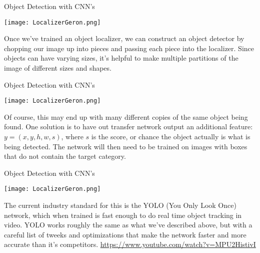 \documentclass[10pt, table, dvipsnames,xcdraw, handout]{beamer}
\begin{document}
\begin{frame}[fragile]{Object Detection with CNN's}
  \begin{minipage}[t][0.4\textheight][t]{\textwidth}\centering
	\centering \texttt{[image: LocalizerGeron.png]}
  \end{minipage}
  \vfill
\begin{minipage}[t][0.6\textheight][t]{\textwidth}
Once we've trained an object localizer, we can construct an object detector by chopping our image up into pieces and passing each piece into the localizer. Since objects can have varying sizes, it's helpful to make multiple partitions of the image of different sizes and shapes. 
\end{minipage}
\end{frame}



\begin{frame}[fragile]{Object Detection with CNN's}
  \begin{minipage}[t][0.4\textheight][t]{\textwidth}\centering
	\centering \texttt{[image: LocalizerGeron.png]}
  \end{minipage}
  \vfill
\begin{minipage}[t][0.6\textheight][t]{\textwidth}
Of course, this may end up with many different copies of the same object being found. One solution is to have out transfer network output an additional feature: $y = (x,y,h,w,s)$, where $s$ is the score, or chance the object actually is what is being detected. The network will then need to be trained on images with boxes that do not contain the target category. 
\end{minipage}
\end{frame}




\begin{frame}[fragile]{Object Detection with CNN's}
  \begin{minipage}[t][0.4\textheight][t]{\textwidth}\centering
	\centering \texttt{[image: LocalizerGeron.png]}
  \end{minipage}
  \vfill
\begin{minipage}[t][0.6\textheight][t]{\textwidth}
The current industry standard for this is the YOLO (You Only Look Once) network, which when trained is fast enough to do real time object tracking in video. YOLO works roughly the same as what we've described above, but with a careful list of tweeks and optimizations that make the network faster and more accurate than it's competitors. \url{https://www.youtube.com/watch?v=MPU2HistivI}
\end{minipage}
\end{frame}
\end{document}
